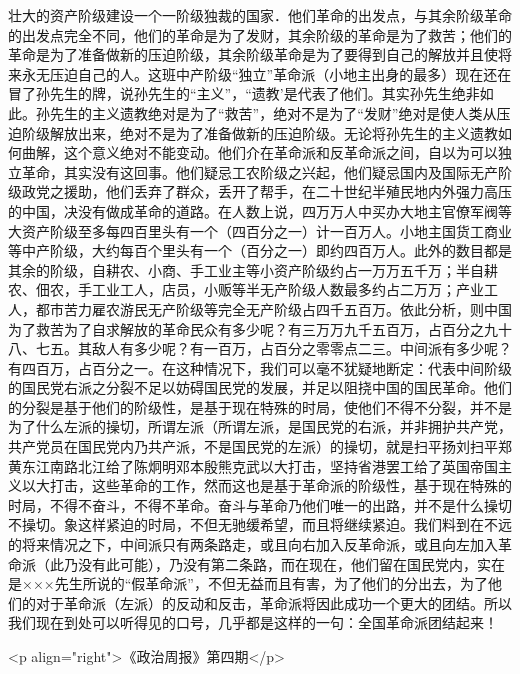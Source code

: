 壮大的资产阶级建设一个一阶级独裁的国家．他们革命的出发点，与其余阶级革命的出发点完全不同，他们的革命是为了发财，其余阶级的革命是为了救苦；他们的革命是为了准备做新的压迫阶级，其余阶级革命是为了要得到自己的解放并且使将来永无压迫自己的人。这班中产阶级“独立”革命派（小地主出身的最多）现在还在冒了孙先生的牌，说孙先生的“主义”，“遗教’是代表了他们。其实孙先生绝非如此。孙先生的主义遗教绝对是为了“救苦”，绝对不是为了“发财”绝对是使人类从压迫阶级解放出来，绝对不是为了准备做新的压迫阶级。无论将孙先生的主义遗教如何曲解，这个意义绝对不能变动。他们介在革命派和反革命派之间，自以为可以独立革命，其实没有这回事。他们疑忌工农阶级之兴起，他们疑忌国内及国际无产阶级政党之援助，他们丢弃了群众，丢开了帮手，在二十世纪半殖民地内外强力高压的中国，决没有做成革命的道路。在人数上说，四万万人中买办大地主官僚军阀等大资产阶级至多每四百里头有一个（四百分之一）计一百万人。小地主国货工商业等中产阶级，大约每百个里头有一个（百分之一）即约四百万人。此外的数目都是其余的阶级，自耕农、小商、手工业主等小资产阶级约占一万万五千万；半自耕农、佃农，手工业工人，店员，小贩等半无产阶级人数最多约占二万万；产业工人，都市苦力雇农游民无产阶级等完全无产阶级占四千五百万。依此分析，则中国为了救苦为了自求解放的革命民众有多少呢？有三万万九千五百万，占百分之九十八、七五。其敌人有多少呢？有一百万，占百分之零零点二三。中间派有多少呢？有四百万，占百分之一。在这种情况下，我们可以毫不犹疑地断定：代表中间阶级的国民党右派之分裂不足以妨碍国民党的发展，并足以阻挠中国的国民革命。他们的分裂是基于他们的阶级性，是基于现在特殊的时局，使他们不得不分裂，并不是为了什么左派的操切，所谓左派（所谓左派，是国民党的右派，并非拥护共产党，共产党员在国民党内乃共产派，不是国民党的左派）的操切，就是扫平扬刘扫平郑黄东江南路北江给了陈炯明邓本殷熊克武以大打击，坚持省港罢工给了英国帝国主义以大打击，这些革命的工作，然而这也是基于革命派的阶级性，基于现在特殊的时局，不得不奋斗，不得不革命。奋斗与革命乃他们唯一的出路，并不是什么操切不操切。象这样紧迫的时局，不但无驰缓希望，而且将继续紧迫。我们料到在不远的将来情况之下，中间派只有两条路走，或且向右加入反革命派，或且向左加入革命派（此乃没有此可能），乃没有第二条路，而在现在，他们留在国民党内，实在是×××先生所说的“假革命派”，不但无益而且有害，为了他们的分出去，为了他们的对于革命派（左派）的反动和反击，革命派将因此成功一个更大的团结。所以我们现在到处可以听得见的口号，几乎都是这样的一句：全国革命派团结起来！

<p align="right">《政治周报》第四期</p>

